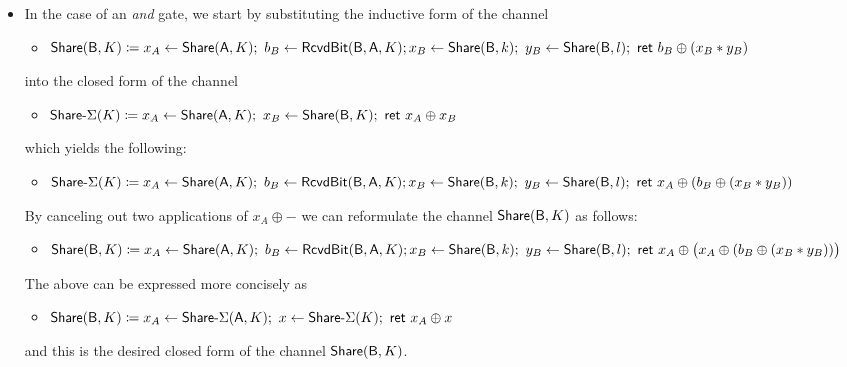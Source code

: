 \begin{itemize}
\item In the case of an \emph{and} gate, we start by substituting the inductive form of the channel
\begin{itemize}
\item $\mathsf{Share}(\mathsf{B},K) \coloneqq x_A \leftarrow \mathsf{Share}(\mathsf{A},K); \ b_B \leftarrow \mathsf{RcvdBit}(\mathsf{B},\mathsf{A},K); \\ x_B \leftarrow \mathsf{Share}(\mathsf{B},k); \ y_B \leftarrow \mathsf{Share}(\mathsf{B},l); \ \mathsf{ret} \ b_B \oplus (x_B * y_B)$
\end{itemize}
into the closed form of the channel
\begin{itemize}
\item $\mathsf{Share}\textsf{-}\Sigma(K) \coloneqq x_A \leftarrow \mathsf{Share}(\mathsf{A},K); \ x_B \leftarrow \mathsf{Share}(\mathsf{B},K); \ \mathsf{ret} \ x_A \oplus x_B$
\end{itemize}
which yields the following:
\begin{itemize}
\item $\mathsf{Share}\textsf{-}\Sigma(K) \coloneqq x_A \leftarrow \mathsf{Share}(\mathsf{A},K); \ b_B \leftarrow \mathsf{RcvdBit}(\mathsf{B},\mathsf{A},K); \\ x_B \leftarrow \mathsf{Share}(\mathsf{B},k); \ y_B \leftarrow \mathsf{Share}(\mathsf{B},l); \ \mathsf{ret} \ x_A \oplus (b_B \oplus (x_B * y_B))$
\end{itemize}
By canceling out two applications of $x_A \oplus -$ we can reformulate the channel $\mathsf{Share}(\mathsf{B},K)$ as follows:
\begin{itemize}
\item $\mathsf{Share}(\mathsf{B},K) \coloneqq x_A \leftarrow \mathsf{Share}(\mathsf{A},K); \ b_B \leftarrow \mathsf{RcvdBit}(\mathsf{B},\mathsf{A},K); \\ x_B \leftarrow \mathsf{Share}(\mathsf{B},k); \ y_B \leftarrow \mathsf{Share}(\mathsf{B},l); \ \mathsf{ret} \ x_A \oplus \big(x_A \oplus (b_B \oplus (x_B * y_B))\big)$
\end{itemize}
The above can be expressed more concisely as
\begin{itemize}
\item $\mathsf{Share}(\mathsf{B},K) \coloneqq x_A\leftarrow \mathsf{Share}\textsf{-}\Sigma(\mathsf{A},K); \ x \leftarrow \mathsf{Share}\textsf{-}\Sigma(K); \ \mathsf{ret} \ x_A \oplus x$
\end{itemize}
and this is the desired closed form of the channel $\mathsf{Share}(\mathsf{B},K)$.


\end{itemize}
